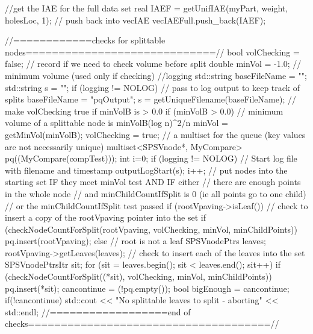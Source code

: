 \begin{DoxyCode}
{{      //get the IAE for the full data set
      real IAEF = getUnifIAE(myPart, weight, holesLoc, 1);
      // push back into vecIAE 
      vecIAEFull.push_back(IAEF);

    //============checks  for splittable nodes=============================//
        bool volChecking = false; // record if we need to check volume before
       split
        double minVol = -1.0; // minimum volume (used only if checking)
        //logging
        std::string baseFileName = "";
        std::string s = "";
        if (logging != NOLOG) {
            // pass to log output to keep track of splits
            baseFileName = "pqOutput";
            s = getUniqueFilename(baseFileName);
        }
        // make volChecking true if minVolB is > 0.0
        if (minVolB > 0.0) {
            // minimum volume of a splittable node is minVolB(log n)^2/n
            minVol = getMinVol(minVolB);
            volChecking = true;
        }
      // a multiset for the queue (key values are not necessarily unique)
      multiset<SPSVnode*, MyCompare> pq((MyCompare(compTest)));
      int i=0;
      if (logging != NOLOG) {
             // Start log file with filename and timestamp
            outputLogStart(s);    
            i++;
      }
      // put nodes into the starting set IF they meet minVol test AND IF either
      // there are enough points in the whole node
      // and minChildCountIfSplit is 0 (ie all points go to one child)
      // or the minChildCountIfSplit test passed
        if (rootVpaving->isLeaf()) {
            // check to insert a copy of the rootVpaving pointer into the set
           if (checkNodeCountForSplit(rootVpaving, volChecking, minVol,
                minChildPoints)) {
                    pq.insert(rootVpaving);
            }
        }
        else { // root is not a leaf
            SPSVnodePtrs leaves;
            rootVpaving->getLeaves(leaves);
            // check to insert each of the leaves into the set
            SPSVnodePtrsItr sit;            
            for (sit = leaves.begin(); sit < leaves.end(); sit++) {
                if (checkNodeCountForSplit((*sit), volChecking, minVol,
                minChildPoints)) {
               pq.insert(*sit);
                }
            }
        }
        cancontinue = (!pq.empty());
        bool bigEnough = cancontinue;
        if(!cancontinue) {
            std::cout << "No splittable leaves to split - aborting" << 
      std::endl;
        }        
        //==================end of
       checks=====================================//
  
}}
\end{DoxyCode}
